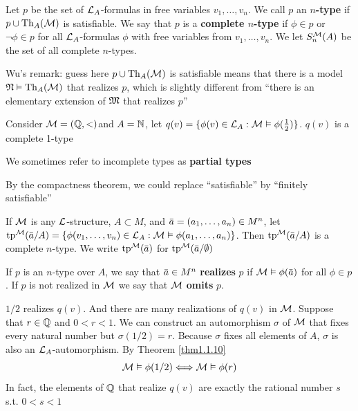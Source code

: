 \documentclass[11pt]{article}
\begin{document}
\begin{definition}[]
Let \(p\) be the set of \(\mathcal{L}_A\)-formulas in free variables \(v_1,\dots,v_n\). We call \(p\) an
\textbf{\(n\)-type} if \(p\cup\operatorname{Th}_A(\mathcal{M})\) is satisfiable. We say that \(p\) is a \textbf{complete \(n\)-type}
if \(\phi\in p\) or \(\neg\phi\in p\) for all \(\mathcal{L}_A\)-formulas \(\phi\) with free variables from \(v_1,\dots,v_n\). We
let \(S_n^{\mathcal{M}}(A)\) be the set of all complete \(n\)-types.
\end{definition}

\begin{remark}
Wu's remark: guess here \(p\cup\operatorname{Th}_A(\mathcal{M})\) is satisfiable means that there is a model \(\mathfrak{N}\vDash\operatorname{Th}_A(\mathcal{M})\)
that realizes \(p\), which is slightly different from ``there is an elementary extension
of \(\mathfrak{M}\) that realizes \(p\)''
\end{remark}

Consider \(\mathcal{M}=(\mathbb{Q},<)\)and \(A=\mathbb{N}\), let \(q(v)=\{\phi(v)\in\mathcal{L}_A:\mathcal{M}\vDash\phi(\frac{1}{2})\}\). \(q(v)\) is a complete 1-type

We sometimes refer to incomplete types as \textbf{partial types}

By the compactness theorem, we could replace ``satisfiable'' by ``finitely satisfiable''

If \(\mathcal{M}\) is any \(\mathcal{L}\)-structure, \(A\subset M\), and \(\bara=(a_1,\dots,a_n)\in M^n\), let
\(\tp^{\calm}(\bara/A)=\{\phi(v_1,\dots,v_n)\in\call_A:\calm\vDash\phi(a_1,\dots,a_n)\}\). Then \(\tp^{\calm}(\bara/A)\) is a
complete \(n\)-type. We write \(\tp^{\calm}(\bara)\) for \(\tp^{\calm}(\bara/\emptyset)\)

\begin{definition}[]
If \(p\) is an \(n\)-type over \(A\), we say that \(\bara\in M^n\) \textbf{realizes} \(p\) if \(\calm\vDash\phi(\bara)\)
for all \(\phi\in p\). If \(p\) is not realized in \(\mathcal{M}\) we say that \(\mathcal{M}\) \textbf{omits} \(p\).
\end{definition}

\(1/2\) realizes \(q(v)\). And there are many realizations of \(q(v)\) in \(\mathcal{M}\). Suppose
that \(r\in\mathbb{Q}\) and \(0<r<1\). We can construct an automorphism \(\sigma\) of \(\mathcal{M}\) that fixes every natural
number but \(\sigma(1/2)=r\). Because \(\sigma\) fixes all elements of \(A\), \(\sigma\) is also
an \(\mathcal{L}_A\)-automorphism. By Theorem \ref{thm1.1.10}
\begin{equation*}
\mathcal{M}\vDash\phi(1/2)\Longleftrightarrow\mathcal{M}\vDash\phi(r)
\end{equation*}
In fact, the elements of \(\mathbb{Q}\) that realize \(q(v)\) are exactly the rational number \(s\) s.t. \(0<s<1\)
\end{document}
